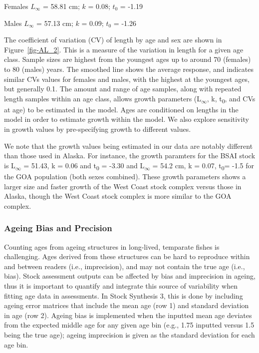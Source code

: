 \documentclass[
]{scrartcl}
\begin{document}
\begin{centering}

Females $L_{\infty}$ = 58.81 cm; $k$ = 0.08; $t_0$ = -1.19

Males $L_{\infty}$ = 57.13 cm; $k$ = 0.09; $t_0$ = -1.26

\end{centering}

The coefficient of variation (CV) of length by age and sex are shown in
Figure~\ref{fig-AL_2}. This is a measure of the variation in length for
a given age class. Sample sizes are highest from the youngest ages up to
around 70 (females) to 80 (males) years. The smoothed line shows the
average response, and indicates similar CVs values for females and
males, with the highest at the youngest ages, but generally 0.1. The
amount and range of age samples, along with repeated length samples
within an age class, allows growth parameters
(L\textsubscript{\(\infty\)}, k, t\textsubscript{0}, and CVs at age) to
be estimated in the model. Ages are conditioned on lengths in the model
in order to estimate growth within the model. We also explore
sensitivity in growth values by pre-specifying growth to different
values.

We note that the growth values being estimated in our data are notably
different than those used in Alaska. For instance, the growth paramters
for the BSAI stock is L\textsubscript{\(\infty\)} = 51.43, k = 0.06 and
t\textsubscript{0} = -3.30 and L\textsubscript{\(\infty\)} = 54.2 cm, k
= 0.07, t\textsubscript{0}= -1.5 for the GOA population (both sexes
combined). These growth parameters shows a larger size and faster growth
of the West Coast stock complex versus those in Alaska, though the West
Coast stock complex is more similar to the GOA complex.

\subsubsection{Ageing Bias and
Precision}\label{ageing-bias-and-precision}

Counting ages from ageing structures in long-lived, temparate fishes is
challenging. Ages derived from these structures can be hard to reproduce
within and between readers (i.e., imprecision), and may not contain the
true age (i.e., bias). Stock assessment outputs can be affected by bias
and imprecision in ageing, thus it is important to quantify and
integrate this source of variability when fitting age data in
assessments. In Stock Synthesis 3, this is done by including ageing
error matrices that include the mean age (row 1) and standard deviation
in age (row 2). Ageing bias is implemented when the inputted mean age
deviates from the expected middle age for any given age bin (e.g., 1.75
inputted versus 1.5 being the true age); ageing imprecision is given as
the standard deviation for each age bin.
\end{document}
